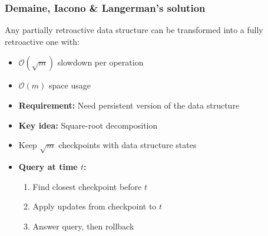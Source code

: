 \documentclass[fleqn]{beamer}
\newcommand{\Oh}{\mathcal{O}}
\begin{document}
\begin{frame}
    \frametitle{Demaine, Iacono \& Langerman's solution}
    
    \begin{theorem}[Theorem 5, 2007]
        Any partially retroactive data structure can be transformed into a fully retroactive one with:
        \begin{itemize}
        \item $\Oh(\sqrt{m})$ slowdown per operation
        \item $\Oh(m)$ space usage
        \item \textbf{Requirement:} Need persistent version of the data structure
        \end{itemize}
    \end{theorem} \pause
    
    \begin{itemize}
    \item \textbf{Key idea:} Square-root decomposition \vfill
    \item Keep $\sqrt{m}$ checkpoints with data structure states \vfill\pause
    \item \textbf{Query at time $t$:}
        \begin{enumerate}
        \item Find closest checkpoint before $t$
        \item Apply updates from checkpoint to $t$
        \item Answer query, then rollback
        \end{enumerate} \vfill
    \end{itemize}
\end{frame}
\end{document}
